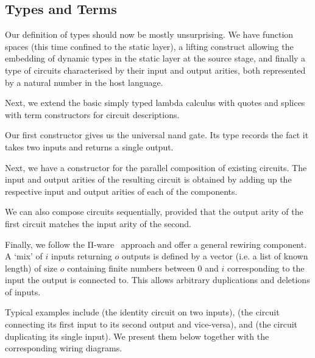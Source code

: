 \documentclass{article}
\begin{document}
\subsection{Types and Terms}

Our definition of types should now be mostly unsurprising.
We have function spaces (this time confined to the static
layer), a lifting construct allowing the embedding of
dynamic types in the static layer at the source stage,
and finally a type of circuits characterised by their input
and output arities, both represented by a natural number in
the host language.


Next, we extend the basic simply typed lambda calculus with
quotes and splices with term constructors for circuit descriptions.

Our first constructor gives us the universal nand gate.
Its type records the fact it takes two inputs and returns
a single output.


Next, we have a constructor for the parallel composition
of existing circuits. The input and output arities of the
resulting circuit is obtained by adding up the respective
input and output arities of each of the components.


We can also compose circuits sequentially, provided
that the output arity of the first circuit matches
the input arity of the second.


Finally, we follow the Π-ware~\cite{DBLP:conf/types/FlorSS15}
approach and offer a general rewiring component.
A `mix' of $i$ inputs returning $o$ outputs is defined by
a vector (i.e. a list of known length) of size $o$
containing finite numbers between $0$ and $i$
corresponding to the input the output is connected to.
%
This allows arbitrary duplications and deletions
of inputs.



Typical examples include
 (the identity circuit on two inputs),
 (the circuit connecting its first input to its second output and vice-versa),
and  (the circuit duplicating its single input).
We present them below together with the corresponding wiring diagrams.
\end{document}
